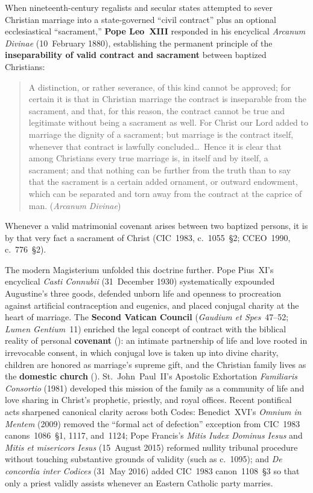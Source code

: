 When nineteenth-century regalists and secular states attempted to sever Christian marriage into a state-governed ``civil contract'' plus an optional ecclesiastical ``sacrament,'' \textbf{Pope Leo~XIII} responded in his encyclical \emph{Arcanum Divinae} (10~February 1880), establishing the permanent principle of the \textbf{inseparability of valid contract and sacrament} between baptized Christians:
\begin{quotation}
A distinction, or rather severance, of this kind cannot be approved; for certain it is that in Christian marriage the contract is inseparable from the sacrament, and that, for this reason, the contract cannot be true and legitimate without being a sacrament as well. For Christ our Lord added to marriage the dignity of a sacrament; but marriage is the contract itself, whenever that contract is lawfully concluded\ldots\ Hence it is clear that among Christians every true marriage is, in itself and by itself, a sacrament; and that nothing can be further from the truth than to say that the sacrament is a certain added ornament, or outward endowment, which can be separated and torn away from the contract at the caprice of man. (\emph{Arcanum Divinae})
\end{quotation}
Whenever a valid matrimonial covenant arises between two baptized persons, it is by that very fact a sacrament of Christ (CIC~1983, c.~1055~\S2; CCEO~1990, c.~776~\S2).

The modern Magisterium unfolded this doctrine further. Pope Pius~XI's encyclical \emph{Casti Connubii} (31~December 1930) systematically expounded Augustine's three goods, defended unborn life and openness to procreation against artificial contraception and eugenics, and placed conjugal charity at the heart of marriage. The \textbf{Second Vatican Council} (\emph{Gaudium et Spes}~47--52; \emph{Lumen Gentium}~11) enriched the legal concept of contract with the biblical reality of personal \textbf{covenant} (): an intimate partnership of life and love rooted in irrevocable consent, in which conjugal love is taken up into divine charity, children are honored as marriage's supreme gift, and the Christian family lives as the \textbf{domestic church} (). St.~John~Paul~II's Apostolic Exhortation \emph{Familiaris Consortio} (1981) developed this mission of the family as a community of life and love sharing in Christ's prophetic, priestly, and royal offices. Recent pontifical acts sharpened canonical clarity across both Codes: Benedict~XVI's \emph{Omnium in Mentem} (2009) removed the ``formal act of defection'' exception from CIC~1983 canons~1086~\S1, 1117, and~1124; Pope Francis's \emph{Mitis Iudex Dominus Iesus} and \emph{Mitis et misericors Iesus} (15~August 2015) reformed nullity tribunal procedure without touching substantive grounds of validity (such as c.~1095); and \emph{De concordia inter Codices} (31~May 2016) added CIC~1983 canon~1108~\S3 so that only a priest validly assists whenever an Eastern Catholic party marries.

